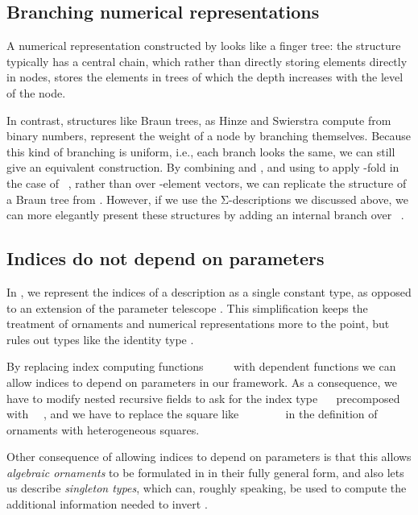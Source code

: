 \subsection{Branching numerical representations}
A numerical representation constructed by  looks like a finger tree: the structure typically has a central chain, which rather than directly storing elements directly in nodes, stores the elements in trees of which the depth increases with the level of the node.

In contrast, structures like Braun trees, as Hinze and Swierstra \cite{calcdata} compute from binary numbers, represent the weight of a node by branching themselves. Because this kind of branching is uniform, i.e., each branch looks the same, we can still give an equivalent construction. By combining  and , and using 
to apply  -fold in the case of \ , rather than over -element vectors, we can replicate the structure of a Braun tree from . However, if we use the Σ-descriptions we discussed above, we can more elegantly present these structures by adding an internal branch over \ .

\subsection{Indices do not depend on parameters}\label{sec:no-dep-ix}
In , we represent the indices of a description as a single constant type, as opposed to an extension of the parameter telescope \cite{practgen}. This simplification keeps the treatment of ornaments and numerical representations more to the point, but rules out types like the identity type . 

By replacing index computing functions \ \AF{\&}\ \ \  with dependent functions
we can allow indices to depend on parameters in our framework. As a consequence, we have to modify nested recursive fields to ask for the index type \ \  precomposed with \ \ , and we have to replace the square like \ \ \ \ \ \ \  in the definition of ornaments with heterogeneous squares.

Other consequence of allowing indices to depend on parameters is that this allows \emph{algebraic ornaments} \cite{algorn} to be formulated in  in their fully general form, and also lets us describe \emph{singleton types}, which can, roughly speaking, be used to compute the additional information needed to invert .


